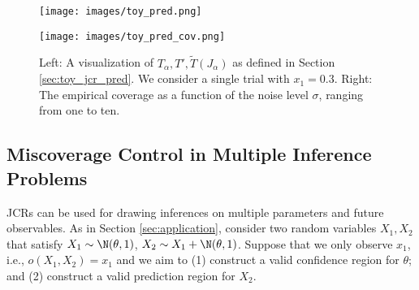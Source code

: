 \documentclass[english]{article}
\begin{document}
\begin{figure}
\begin{minipage}[ht]{0.5\linewidth}
\centering
    \texttt{[image: images/toy\_pred.png]}
    \end{minipage}
    \qquad
\begin{minipage}[ht]{0.5\linewidth}
\centering
    \texttt{[image: images/toy\_pred\_cov.png]}
    \end{minipage}
\caption{Left: A visualization of  $T_\alpha, T', \tilde{T}(J_{\alpha})$ as defined in Section \ref{sec:toy_jcr_pred}.
We consider a single trial with $x_1 = 0.3$. 
Right: The empirical coverage as a function of the noise level $\sigma$, ranging from one to ten.}
\label{fig:toy_pred}
\end{figure}



\subsection{Miscoverage Control in Multiple Inference Problems }\label{sec:multiple-task}
JCRs can be used for drawing inferences on multiple parameters and future observables.
As in Section \ref{sec:application}, consider two random variables $X_1,X_2$ that satisfy $X_1 \sim \N(\theta,1)$, $X_2 \sim X_1 + \N(\theta,1)$.
Suppose that we only observe $x_1$, i.e., $o(X_1,X_2) = x_1$  and we aim to (1)
construct a valid confidence region for $\theta$;
and 
(2) construct a valid prediction region for $X_2$.
\end{document}
